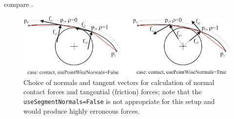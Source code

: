     compare .
    \begin{figure}[tbph]
      \begin{center}
      \includegraphics[width=16cm]{figures/ContactFrictionCircleCable2Dnormals.pdf}
      \end{center}
      \caption{Choice of normals and tangent vectors for calculation of normal contact forces and tangential (friction) forces; 
      note that the \texttt{useSegmentNormals=False} is not appropriate for this setup and would produce highly erroneous forces.}
    	\label{fig:ObjectContactFrictionCircleCable2D:normals}
    \end{figure}
    
